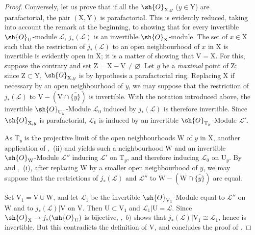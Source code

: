 \begin{proof}
Conversely, let us prove that if all the $\sh{O}_{\mathrm{X},y}$ ($y\in\mathrm{Y}$) are parafactorial, the pair $(\mathrm{X},\mathrm{Y})$ is parafactorial.
This is evidently reduced, taking into account the remark at the beginning, to showing that for every invertible $\sh{O}_{\mathrm{U}}$-module $\mathscr{L}$, $j_*(\mathscr{L})$ is an invertible $\sh{O}_{\mathrm{X}}$-module.
The set of $x\in\mathrm{X}$ such that the restriction of $j_*(\mathscr{L})$ to an open neighbourhood of $x$ in $\mathrm{X}$ is invertible is evidently open in $\mathrm{X}$; it is a matter of showing that $\mathrm{V}=\mathrm{X}$.
For this, suppose the contrary and set $\mathrm{Z}=\mathrm{X}-\mathrm{V}\neq\varnothing$.
Let $y$ be a \emph{maximal} point of $\mathrm{Z}$; since $\mathrm{Z}\subset\mathrm{Y}$, $\sh{O}_{\mathrm{X},y}$ is by hypothesis a parafactorial ring.
Replacing $\mathrm{X}$ if necessary by an open neighbourhood of $y$, we may suppose that the restriction of $j_*(\mathscr{L})$ to $\mathrm{V}-(\mathrm{V}\cap\overline{\{y\}})$ is invertible. With the notation introduced above, the invertible $\sh{O}_{\mathrm{U}_y}$-Module $\mathscr{L}_0$ induced by $j_*(\mathscr{L})$ is therefore invertible. Since $\sh{O}_{\mathrm{X},y}$ is parafactorial, $\mathscr{L}_0$ is induced by an invertible $\sh{O}_{\mathrm{T}_y}$-Module $\mathscr{L}'$.

As $\mathrm{T}_y$ is the projective limit of the open neighbourhoods $\mathrm{W}$ of $y$ in $\mathrm{X}$, another application of ,~(ii) and  yields such a neighbourhood $\mathrm{W}$ and an invertible $\sh{O}_{\mathrm{W}}$-Module $\mathscr{L}''$ inducing $\mathscr{L}'$ on $\mathrm{T}_y$, and therefore inducing $\mathscr{L}_0$ on $\mathrm{U}_y$. By  and ,~(i), after replacing $\mathrm{W}$ by a smaller open neighbourhood of $y$, we may suppose that the restrictions of $j_*(\mathscr{L})$ and $\mathscr{L}''$ to $\mathrm{W}-(\mathrm{W}\cap\overline{\{y\}})$ are equal.

Set $\mathrm{V}_1=\mathrm{V}\cup\mathrm{W}$, and let $\mathscr{L}_1$ be the invertible $\sh{O}_{\mathrm{V}_1}$-Module equal to $\mathscr{L}''$ on $\mathrm{W}$ and to $j_*(\mathscr{L})|\mathrm{V}$ on $\mathrm{V}$. Then $\mathrm{U}\subset\mathrm{V}_1$ and $\mathscr{L}_1|\mathrm{U}=\mathscr{L}$. Since $\sh{O}_{\mathrm{X}}\to j_*(\sh{O}_{\mathrm{U}})$ is bijective, ,~$b)$ shows that $j_*(\mathscr{L})|\mathrm{V}_1\cong\mathscr{L}_1$, hence is invertible.
But this contradicts the definition of $\mathrm{V}$, and concludes the proof of .
\end{proof}

